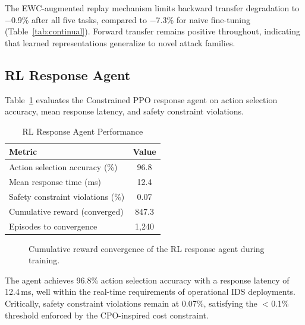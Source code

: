 \documentclass[journal,twoside]{IEEEtran}
\begin{document}
The EWC-augmented replay mechanism limits backward transfer degradation to $-$0.9\% after all five tasks, compared to $-$7.3\% for naive fine-tuning (Table~\ref{tab:continual}). Forward transfer remains positive throughout, indicating that learned representations generalize to novel attack families.

\subsection{RL Response Agent}

Table~\ref{tab:rl_response} evaluates the Constrained PPO response agent on action selection accuracy, mean response latency, and safety constraint violations.

\begin{table}[!t]
\centering
\caption{RL Response Agent Performance}
\label{tab:rl_response}
\renewcommand{\arraystretch}{1.15}
\begin{tabular}{@{}lc@{}}
\toprule
\textbf{Metric} & \textbf{Value} \\
\midrule
Action selection accuracy (\%)  & 96.8 \\
Mean response time (ms)         & 12.4 \\
Safety constraint violations (\%) & 0.07 \\
Cumulative reward (converged)   & 847.3 \\
Episodes to convergence         & 1,240 \\
\bottomrule
\end{tabular}
\end{table}

\begin{figure}[!t]
\centering
{}
\caption{Cumulative reward convergence of the RL response agent during training.}
\label{fig:reward_convergence}
\end{figure}

The agent achieves 96.8\% action selection accuracy with a response latency of 12.4\,ms, well within the real-time requirements of operational IDS deployments. Critically, safety constraint violations remain at 0.07\%, satisfying the $<$0.1\% threshold enforced by the CPO-inspired cost constraint.
\end{document}
